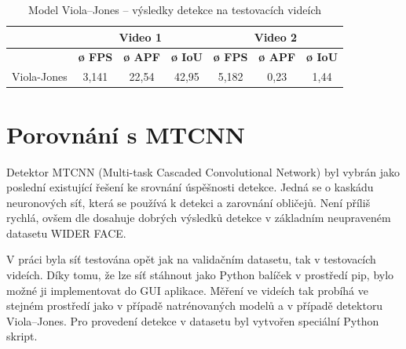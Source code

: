 \begin{table}[H]
  \centering
  \begin{tabular}{c|ccc|ccc|}
  \cline{2-7}
                                                               & \multicolumn{3}{c|}{\cellcolor[HTML]{CBCEFB}\textbf{Video 1}}                                                                              & \multicolumn{3}{c|}{\cellcolor[HTML]{CBCEFB}\textbf{Video 2}}                                                                              \\ \hline
  \rowcolor[HTML]{E0DBDB} 
  \multicolumn{1}{|c|}{\cellcolor[HTML]{E0DBDB}\textbf{Model}} & \multicolumn{1}{c|}{\cellcolor[HTML]{E0DBDB}\textbf{ø FPS}} & \multicolumn{1}{c|}{\cellcolor[HTML]{E0DBDB}\textbf{ø APF}} & \textbf{ø IoU} & \multicolumn{1}{c|}{\cellcolor[HTML]{E0DBDB}\textbf{ø FPS}} & \multicolumn{1}{c|}{\cellcolor[HTML]{E0DBDB}\textbf{ø APF}} & \textbf{ø IoU} \\ \hline
  \multicolumn{1}{|c|}{\cellcolor[HTML]{E0DBDB}Viola-Jones}    & \multicolumn{1}{c|}{3,141}                                  & \multicolumn{1}{c|}{22,54}                                  & 42,95          & \multicolumn{1}{c|}{5,182}                                  & \multicolumn{1}{c|}{0,23}                                   & 1,44           \\ \hline
  \end{tabular}
  \label{tabulka:violajonesvidea}
  \caption{Model Viola--Jones -- výsledky detekce na testovacích videích}
\end{table}

\section{Porovnání s MTCNN}
\label{sekce:mtcnn}
Detektor MTCNN (Multi-task Cascaded Convolutional Network) \cite{mtcnn, mtcnnpaper} byl vybrán jako poslední existující řešení ke srovnání úspěšnosti detekce. Jedná se o kaskádu neuronových síť, která se používá k detekci a zarovnání obličejů. Není příliš rychlá, ovšem dle \cite{mtcnnpaper} dosahuje dobrých výsledků detekce v základním neupraveném datasetu WIDER FACE.

V práci byla síť testována opět jak na validačním datasetu, tak v testovacích videích. Díky tomu, že lze síť stáhnout jako Python balíček v prostředí pip, bylo možné ji implementovat do GUI aplikace. Měření ve videích tak probíhá ve stejném prostředí jako v případě natrénovaných modelů a v případě detektoru Viola--Jones. Pro provedení detekce v datasetu byl vytvořen speciální Python skript.

